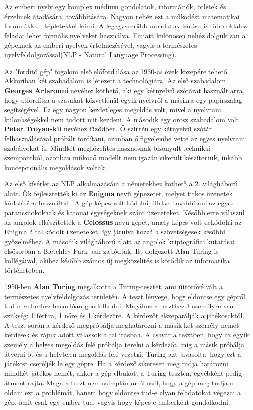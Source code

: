 

Az emberi nyelv egy komplex médium gondolatok, információk, ötletek és érzelmek átadására, továbbítására. Nagyon nehéz ezt a működést matematikai formulákkal, képletekkel leírni. A legegyszerűbb mondatok leírása is több oldalas feladat lehet formális nyelveket használva. Emiatt különösen nehéz dolguk van a gépeknek az emberi nyelvek értelmezésével, vagyis a természetes nyelvfeldolgozással(NLP - Natural Language Processing).

Az "fordító gép" fogalom első előfordulása az 1930-as évek közepére tehető. Akkoriban két szabadalom is létezett a technológiára. Az első szabadalom \textbf{Georges Artsrouni} nevéhez köthető, aki egy kétnyelvű szótárat használt arra, hogy átfordítsa a szavakat közvetlenül egyik nyelvről a másikra egy papírszalag segítségével. Ez egy nagyon kezdetleges megoldás volt, mivel a nyelvtani különbségekkel nem tudott mit kezdeni. A második egy orosz szabadalom volt \textbf{Peter Troyanskii} nevéhez fűződően. Ő szintén egy kétnyelvű szótár felhasználásával próbált fordítani, azonban ő figyelembe vette az egyes nyelvtani szabályokat is. Mindkét megközelítés hasznosnak bizonyult technikai szempontból, azonban működő modellt nem igazán sikerült készíteniük, inkább koncepcionális megoldások voltak.\cite{history}

Az első kísérlet az NLP alkalmazására a németekhez köthető a 2. világháború alatt. Ők fejlesztették ki az \textbf{Enigma} nevű gépezetet, melyet titkos üzenetek kódolására használtak. A gép képes volt kódolni, illetve továbbítani az egyes parancsnokoknak és katonai egységeknek szánt üzeneteket. Később erre válaszul az angolok elkészítették a \textbf{Colossus} nevű gépet, amely képes volt dekódolni az Enigma által kódolt üzeneteket, így járulva hozzá a szövetségesek későbbi győzelméhez.
A második világháború alatt az angolok kriptográfiai kutatásai elsősorban a Bletchley Park-ban zajlódtak. Itt dolgozott Alan Turing is kollégáival, akihez később számos új megközelítés is kötődik az informatika történetében.\cite{history}

1950-ben \textbf{Alan Turing} megalkotta a Turing-tesztet, ami úttörővé vált a természetes nyelvfeldolgozás területén. A teszt lényege, hogy eldöntse egy gépről tud-e emberhez hasonlóan gondolkodni. Magához a teszthez 3 személyre van szükség: 1 férfira, 1 nőre és 1 kérdezőre. A kérdezőt elszeparálják a játékosoktól. A teszt során a kérdező megpróbálja meghatározni a másik két személy nemét kérdések és rájuk adott válaszok által írásban. A csavar a tesztben, hogy az egyik személy a helyes megoldás felé próbálja terelni a kérdezőt, míg a másik próbálja átverni őt és a helytelen megoldás felé vezetni. Turing azt javasolta, hogy ezt a játékost cseréljék le egy gépre. Ha a kérdező sikeresen meg tudja határozni mindkét játékos nemét, akkor a gép elbukott a Turing-teszten, egyébként pedig átment rajta. Maga a teszt nem szimplán arról szól, hogy a gép meg tudja-e oldani ezt a problémát, hanem hogy eldöntse tud-e olyan feladatokat végezni a gép, amit csak egy ember tud, vagyis hogy képes-e emberként gondolkodni.

